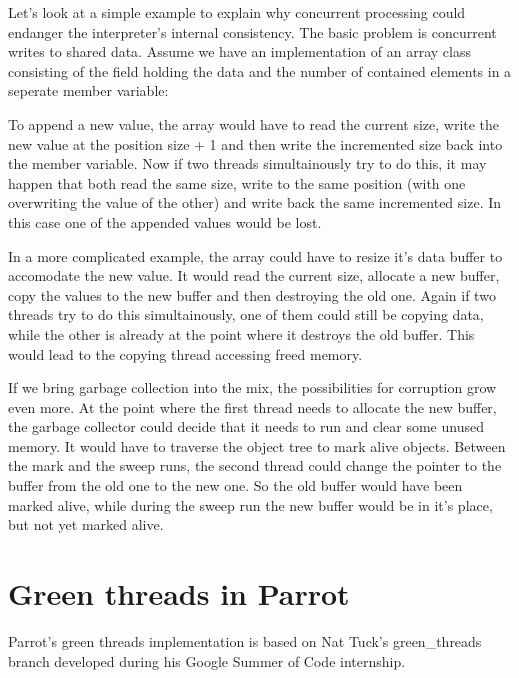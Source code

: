 \documentclass[bachelor,english]{hgbthesis}
\begin{document}
Let's look at a simple example to explain why concurrent processing could endanger the interpreter's internal consistency. The basic problem is concurrent writes to shared data. Assume we have an implementation of an array class consisting of the field holding the data and the number of contained elements in a seperate member variable:
\begin{CCode}
pmclass ResizableIntegerArray auto_attrs provides array {
    ATTR INTVAL   size;      /* number of INTVALs stored in this array */
    ATTR INTVAL * int_array; /* INTVALs are stored here */
\end{CCode}
To append a new value, the array would have to read the current size, write the new value at the position size + 1 and then write the incremented size back into the member variable.
Now if two threads simultainously try to do this, it may happen that both read the same size, write to the same position (with one overwriting the value of the other) and write back the same incremented size. In this case one of the appended values would be lost.

In a more complicated example, the array could have to resize it's data buffer to accomodate the new value. It would read the current size, allocate a new buffer, copy the values to the new buffer and then destroying the old one. Again if two threads try to do this simultainously, one of them could still be copying data, while the other is already at the point where it destroys the old buffer. This would lead to the copying thread accessing freed memory.

If we bring garbage collection into the mix, the possibilities for corruption grow even more. At the point where the first thread needs to allocate the new buffer, the garbage collector could decide that it needs to run and clear some unused memory. It would have to traverse the object tree to mark alive objects. Between the mark and the sweep runs, the second thread could change the pointer to the buffer from the old one to the new one. So the old buffer would have been marked alive, while during the sweep run the new buffer would be in it's place, but not yet marked alive.

\section{Green threads in Parrot}

Parrot's green threads implementation is based on Nat Tuck's green\_threads branch developed during his Google Summer of Code internship.
\end{document}
